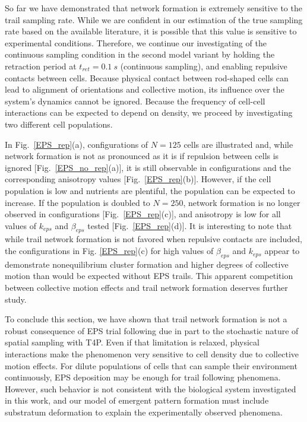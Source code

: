 \documentclass[aps,prl,numerical,reprint,superscriptaddress,showpacs]{revtex4-1}
\begin{document}
So far we have demonstrated that network formation is extremely sensitive to the trail sampling rate. While we are confident in our estimation of the true sampling rate based on the available literature, it is possible that this value is sensitive to experimental conditions. Therefore, we continue our investigating of the continuous sampling condition in the second model variant by holding the retraction period at $t_{ret} = 0.1~s$ (continuous sampling), and enabling repulsive contacts between cells. Because physical contact between rod-shaped cells can lead to alignment of orientations and collective motion, its influence over the system's dynamics cannot be ignored. Because the frequency of cell-cell interactions can be expected to depend on density, we proceed by investigating two different cell populations. 

In Fig.~\ref{EPS_rep}(a), configurations of $N = 125$ cells are illustrated and, while network formation is not as pronounced as it is if repulsion between cells is ignored [Fig.~\ref{EPS_no_rep}(a)], it is still observable in configurations and the corresponding anisotropy values [Fig.~\ref{EPS_rep}(b)]. However, if the cell population is low and nutrients are plentiful, the population can be expected to increase. If the population is doubled to $N = 250$, network formation is no longer observed in configurations [Fig.~\ref{EPS_rep}(c)], and anisotropy is low for all values of $k_{eps}$ and $\beta_{eps}$ tested [Fig.~\ref{EPS_rep}(d)]. It is interesting to note that while trail network formation is not favored when repulsive contacts are included, the configurations in Fig. \ref{EPS_rep}(c) for high values of $\beta_{eps}$ and $k_{eps}$ appear to demonstrate nonequilibrium cluster formation and higher degrees of collective motion than would be expected without EPS trails. This apparent competition between collective motion effects and trail network formation deserves further study. 

To conclude this section, we have shown that trail network formation is not a robust consequence of EPS trial following due in part to the stochastic nature of spatial sampling with T4P. Even if that limitation is relaxed, physical interactions make the phenomenon very sensitive to cell density due to collective motion effects. For dilute populations of cells that can sample their environment continuously, EPS deposition may be enough for trail following phenomena. However, such behavior is not consistent with the biological system investigated in this work, and our model of emergent pattern formation must include substratum deformation to explain the experimentally observed phenomena. 
\end{document}
